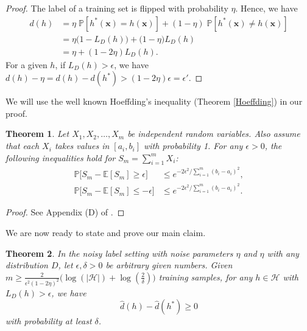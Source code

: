 \documentclass[]{article}
\newtheorem{theorem}{Theorem}
\newcommand{\bx}{\mathbf{x}}
\newcommand{\cH}{\mathcal{H}}
\begin{document}
	\begin{proof} 
		The label of a training set is flipped with probability $\eta$. Hence, we have
		\begin{align}
		d(h) &= \eta \;\mathbb{P}[h^*(\bx) = h(\bx)] + (1-\eta)\; \mathbb{P}[h^*(\bx) \neq h(\bx)]\\
		&= \eta\big(1-L_D(h)\big) + \big(1-\eta\big) L_D(h)\\
		&= \eta + (1-2\eta)L_D(h).
		\end{align} 
		For a given $h$, if $L_D(h)>\epsilon$, we have $d(h) - \eta = d(h) - d(h^*) > (1-2\eta) \epsilon = \epsilon'$.
	\end{proof}
	We will use the well known Hoeffding's inequality (Theorem \eqref{Hoeffding}) in our proof.
	\begin{theorem}
		\label{Hoeffding}
		Let $X_1, X_2, \dots, X_m$ be independent random variables. Also assume that each $X_i$ takes values in $[a_i, b_i]$ with probability 1. For any $\epsilon>0$, the following inequalities hold for $S_m = \sum_{i = 1}^{m}X_i$:
		\begin{align}
		\mathbb{P}\big[S_m - \mathbb{E}[S_m] \geq \epsilon\big] &\leq e^{-2\epsilon^2/\sum_{i = 1}^{m}(b_i-a_i)^2},\\
		\mathbb{P}\big[S_m - \mathbb{E}[S_m] \leq -\epsilon\big] &\leq e^{-2\epsilon^2/\sum_{i = 1}^{m}(b_i-a_i)^2}.
		\end{align}
	\end{theorem} 
	\begin{proof}
		See Appendix (D) of \cite{mohri}.
	\end{proof}
	We are now ready to state and prove our main claim.
	\begin{theorem}
		In the noisy label setting with noise parameters $\eta$ and $\eta$ with any distribution $D$, let $\epsilon, \delta >0$ be arbitrary given numbers. Given 
		$m\geq \frac{2}{\epsilon^2(1-2\eta)^2}\Big(\log(|\cH|) +  \log(\frac{2}{\delta})\Big)$ training samples, for any $h \in \cH$  with $L_D(h) >\epsilon$, we have 
		\begin{equation}
		\hat{d}(h) - \hat{d}(h^*)  \geq 0
		\end{equation}
		with probability at least $\delta$.
	\end{theorem}
\end{document}
